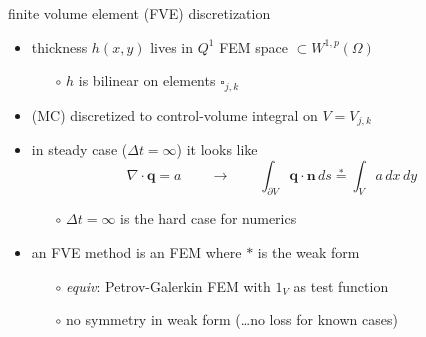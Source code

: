 \documentclass[xcolor={dvipsnames}]{beamer}
\newcommand\bn{\mathbf{n}}
\newcommand\bq{\mathbf{q}}
\newcommand\Div{\nabla\cdot}
\begin{document}
\begin{frame}{finite volume element (FVE) discretization}

\begin{itemize}
\item thickness $h(x,y)$ lives in $Q^1$ FEM space $\subset W^{1,p}(\Omega)$
    \begin{itemize}
    \item[$\circ$] $h$ is bilinear on elements $\square_{j,k}$
    \end{itemize}
\item (MC) discretized to control-volume integral on $V=V_{j,k}$
\item in steady case ($\Delta t = \infty$) it looks like
    $$\Div \bq = a \qquad \to \qquad \int_{\partial V} \bq \cdot \bn \,ds \stackrel{\ast}{=} \int_V a \,dx\,dy$$ 
    \begin{itemize}
    \vspace{-2mm}
    \item[$\circ$] $\Delta t=\infty$ is the hard case for numerics
    \end{itemize}

\smallskip
\item an FVE method is an FEM where $\ast$ is the weak form
    \begin{itemize}
    \item[$\circ$] \emph{equiv}: Petrov-Galerkin FEM with $1_V$ as test function
    \item[$\circ$] no symmetry in weak form (\dots no loss for known cases)
    \end{itemize}
\end{itemize}

\begin{center}
\end{center}
\end{frame}
\end{document}
